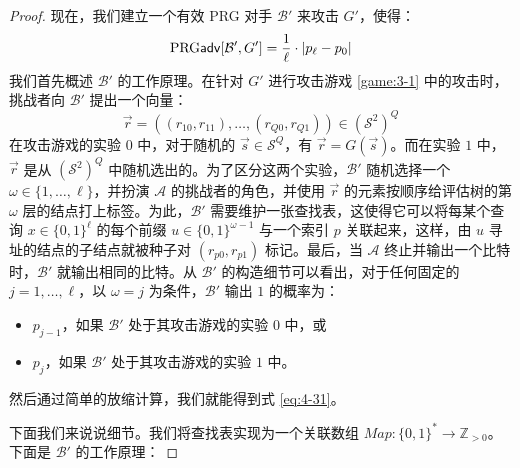 \begin{proof}
现在，我们建立一个有效 PRG 对手 $\mathcal{B}'$ 来攻击 $G'$，使得：
\begin{equation}\label{eq:4-31}
{\rm PRG\mathsf{adv}}[\mathcal{B}',G']=\frac{1}{\ell}\cdot|p_\ell-p_0|
\end{equation}
我们首先概述 $\mathcal{B}'$ 的工作原理。在针对 $G'$ 进行攻击游戏 \ref{game:3-1} 中的攻击时，挑战者向 $\mathcal{B}'$ 提出一个向量：
\begin{equation}\label{eq:4-32}
\vec{r}=((r_{10},r_{11}),\dots,(r_{Q0},r_{Q1}))\in(\mathcal{S}^2)^Q
\end{equation}
在攻击游戏的实验 $0$ 中，对于随机的 $\vec{s}\in\mathcal{S}^Q$，有 $\vec{r}=G(\vec{s})$。而在实验 $1$ 中，$\vec{r}$ 是从 $(\mathcal{S}^2)^Q$ 中随机选出的。为了区分这两个实验，$\mathcal{B}'$ 随机选择一个 $\omega\in\{1,\dots,\ell\}$，并扮演 $\mathcal{A}$ 的挑战者的角色，并使用 $\vec r$ 的元素按顺序给评估树的第 $\omega$ 层的结点打上标签。为此，$\mathcal{B}'$ 需要维护一张查找表，这使得它可以将每某个查询 $x\in\{0,1\}^\ell$ 的每个前缀 $u\in\{0,1\}^{\omega-1}$ 与一个索引 $p$ 关联起来，这样，由 $u$ 寻址的结点的子结点就被种子对 $(r_{p0},r_{p1})$ 标记。最后，当 $\mathcal{A}$ 终止并输出一个比特时，$\mathcal{B}'$ 就输出相同的比特。从 $\mathcal{B}'$ 的构造细节可以看出，对于任何固定的 $j=1,\dots,\ell$，以 $\omega=j$ 为条件，$\mathcal{B}'$ 输出 $1$ 的概率为：
\begin{itemize}
	\item $p_{j-1}$，如果 $\mathcal{B}'$ 处于其攻击游戏的实验 $0$ 中，或
	\item $p_j$，如果 $\mathcal{B}'$ 处于其攻击游戏的实验 $1$ 中。
\end{itemize}
然后通过简单的放缩计算，我们就能得到式 \ref{eq:4-31}。

下面我们来说说细节。我们将查找表实现为一个关联数组 $Map:\{0,1\}^*\to\mathbb{Z}_{>0}$。下面是 $\mathcal{B}'$ 的工作原理：

\vspace{5pt}


\end{proof}
